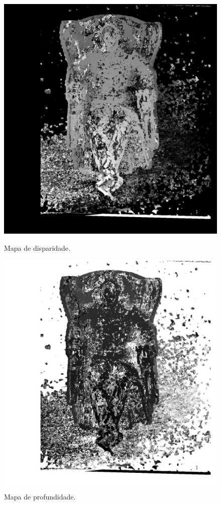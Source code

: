 \documentclass{bmvc2k}
\begin{document}
\begin{figure}[htb]
\centering
\begin{minipage}[t]{0.3\textwidth}
  \centering
  \includegraphics[width=\linewidth]{figs/morpheus_disp.jpg}
  \caption{Mapa de disparidade.}
  \label{fig:morpheus_disp}
\end{minipage}
\begin{minipage}[t]{0.3\textwidth}
  \centering
  \includegraphics[width=\linewidth]{figs/morpheus_depth.jpg}
  \caption{Mapa de profundidade.}
  \label{fig:morpheus_depth}
\end{minipage}\hfill
\end{figure}
\end{document}
